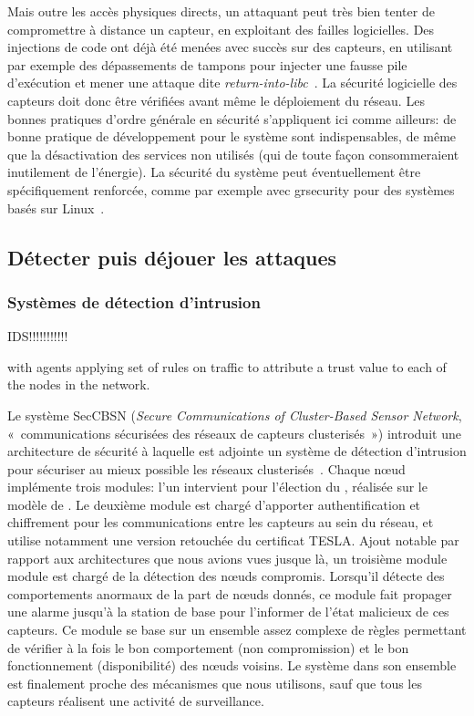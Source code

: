 Mais outre les accès physiques directs, un attaquant peut très bien tenter de compromettre à distance un capteur, en exploitant des failles logicielles.
Des injections de code ont déjà été menées avec succès sur des capteurs, en utilisant par exemple des dépassements de tampons pour injecter une fausse pile d'exécution et mener une attaque dite \textit{return-into-libc}~\cite{FC08}.
La sécurité logicielle des capteurs doit donc être vérifiées avant même le déploiement du réseau.
Les bonnes pratiques d'ordre générale en sécurité s'appliquent ici comme ailleurs: de bonne pratique de développement pour le système sont indispensables, de même que la désactivation des services non utilisés (qui de toute façon consommeraient inutilement de l'énergie).
La sécurité du système peut éventuellement être spécifiquement renforcée, comme par exemple avec grsecurity pour des systèmes basés sur Linux~\cite{GFN11}.

\subsection{Détecter puis déjouer les attaques}

\subsubsection{Systèmes de détection d'intrusion}
IDS!!!!!!!!!!!

with agents applying set of rules\cite{RKKK13} on traffic to attribute a trust value to each of the nodes in the network.

Le système SecCBSN (\textit{Secure Communications of Cluster-Based Sensor Network}, « communications sécurisées des réseaux de capteurs clusterisés ») introduit une architecture de sécurité à laquelle est adjointe un système de détection d'intrusion pour sécuriser au mieux possible les réseaux clusterisés~\cite{HHC07}.
Chaque nœud implémente trois modules: l'un intervient pour l'élection du \ch, réalisée sur le modèle de \leach.
Le deuxième module est chargé d'apporter authentification et chiffrement pour les communications entre les capteurs au sein du réseau, et utilise notamment une version retouchée du certificat TESLA.
Ajout notable par rapport aux architectures que nous avions vues jusque là, un troisième module module est chargé de la détection des nœuds compromis.
Lorsqu'il détecte des comportements anormaux de la part de nœuds donnés, ce module fait propager une alarme jusqu'à la station de base pour l'informer de l'état malicieux de ces capteurs.
Ce module se base sur un ensemble assez complexe de règles permettant de vérifier à la fois le bon comportement (non compromission) et le bon fonctionnement (disponibilité) des nœuds voisins.
Le système dans son ensemble est finalement proche des mécanismes que nous utilisons, sauf que tous les capteurs réalisent une activité de surveillance.

